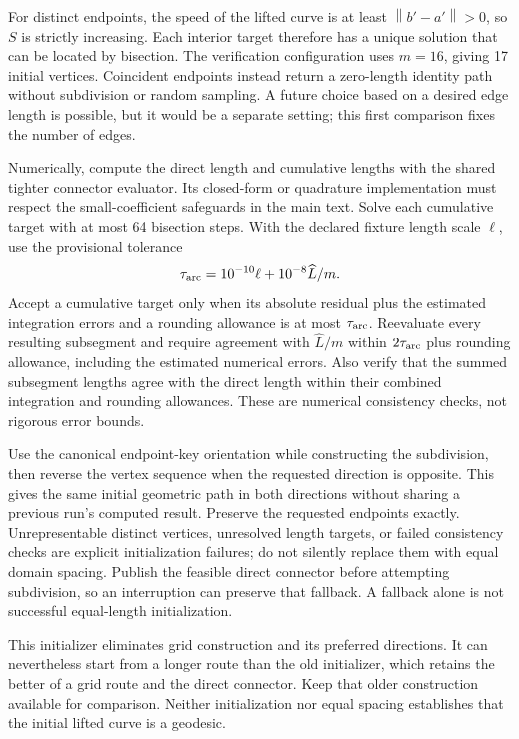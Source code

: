 \documentclass[11pt,letterpaper]{article}
\newcommand{\norm}[1]{\left\lVert#1\right\rVert}
\begin{document}
For distinct endpoints, the speed of the lifted curve is at least
$\norm{b'-a'}>0$, so $S$ is strictly increasing. Each interior target therefore
has a unique solution that can be located by bisection. The verification
configuration uses $m=16$, giving 17 initial vertices. Coincident endpoints
instead return a zero-length identity path without subdivision or random
sampling. A future choice based on a desired edge length is possible, but it
would be a separate setting; this first comparison fixes the number of edges.

Numerically, compute the direct length and cumulative lengths with the shared
tighter connector evaluator. Its closed-form or quadrature implementation
must respect the small-coefficient safeguards in the main text. Solve each
cumulative target with at most 64 bisection steps. With the declared fixture
length scale $\ell$, use the provisional tolerance
\[
 \tau_{\rm arc}=10^{-10}\ell+10^{-8}\widehat L/m.
\]
Accept a cumulative target only when its absolute residual plus the estimated
integration errors and a rounding allowance is at most $\tau_{\rm arc}$.
Reevaluate every resulting subsegment and require agreement with
$\widehat L/m$ within $2\tau_{\rm arc}$ plus rounding allowance, including the
estimated numerical errors. Also verify that the summed subsegment lengths
agree with the direct length within their combined integration and rounding
allowances. These are numerical consistency checks, not rigorous error bounds.

Use the canonical endpoint-key orientation while constructing the subdivision,
then reverse the vertex sequence when the requested direction is opposite.
This gives the same initial geometric path in both directions without sharing
a previous run's computed result. Preserve the requested endpoints exactly.
Unrepresentable distinct vertices, unresolved length targets, or failed
consistency checks are explicit initialization failures; do not silently
replace them with equal domain spacing. Publish the feasible direct connector
before attempting subdivision, so an interruption can preserve that fallback.
A fallback alone is not successful equal-length initialization.

This initializer eliminates grid construction and its preferred directions.
It can nevertheless start from a longer route than the old initializer, which
retains the better of a grid route and the direct connector. Keep that older
construction available for comparison. Neither initialization nor equal
spacing establishes that the initial lifted curve is a geodesic.
\end{document}
